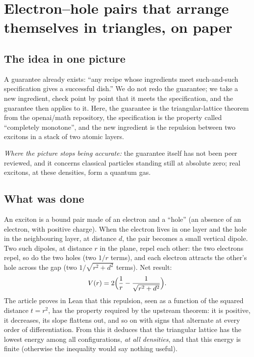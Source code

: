\chapter[Excitons in triangles]{Electron--hole pairs that arrange themselves in triangles, on paper}

\section*{The idea in one picture}

\begin{analogie}
A guarantee already exists: ``any recipe whose ingredients meet such-and-such specification gives a successful
dish.'' We do not redo the guarantee; we take a new ingredient, check point by point that it meets the
specification, and the guarantee then applies to it. Here, the guarantee is the triangular-lattice theorem from the
openai/math repository, the specification is the property called ``completely monotone'', and the new ingredient is
the repulsion between two excitons in a stack of two atomic layers.

\emph{Where the picture stops being accurate:} the guarantee itself has not been peer reviewed, and it concerns
classical particles standing still at absolute zero; real excitons, at these densities, form a quantum gas.
\end{analogie}

\section*{What was done}

An exciton is a bound pair made of an electron and a ``hole'' (an absence of an electron, with positive charge).
When the electron lives in one layer and the hole in the neighbouring layer, at distance $d$, the pair becomes a
small vertical dipole. Two such dipoles, at distance $r$ in the plane, repel each other: the two electrons repel,
so do the two holes (two $1/r$ terms), and each electron attracts the other's hole across the gap (two
$1/\sqrt{r^2+d^2}$ terms). Net result:
\[
V(r)=2\Bigl(\frac1r-\frac1{\sqrt{r^2+d^2}}\Bigr).
\]
The article proves in Lean that this repulsion, seen as a function of the squared distance $t=r^2$, has the
property required by the upstream theorem: it is positive, it decreases, its slope flattens out, and so on with
signs that alternate at every order of differentiation. From this it deduces that the triangular lattice has the
lowest energy among all configurations, \emph{at all densities}, and that this energy is finite (otherwise the
inequality would say nothing useful).

